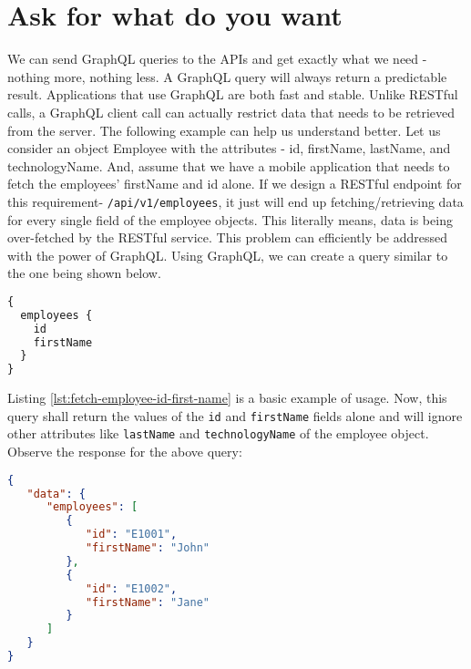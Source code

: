 \documentclass[../main.tex]{subfiles}
\begin{document}
\section{Ask for what do you want}
We can send GraphQL queries to the APIs and get exactly what we need - nothing more, nothing less.
A GraphQL query will always return a predictable result.
Applications that use GraphQL are both fast and stable.
Unlike RESTful calls, a GraphQL client call can actually restrict data that needs to be retrieved from the server.
The following example can help us understand better.
Let us consider an object Employee with the attributes - id, firstName, lastName, and technologyName.
And, assume that we have a mobile application that needs to fetch the employees' firstName and id alone.
If we design a RESTful endpoint for this requirement- \lstinline{/api/v1/employees}, it just will end up fetching/retrieving data for every single field of the employee objects.
This literally means, data is being over-fetched by the RESTful service.
This problem can efficiently be addressed with the power of GraphQL.
Using GraphQL, we can create a query similar to the one being shown below.
\begin{lstlisting}[language=GraphQL, caption={Employee fetch id and name only using GraphQL query}, label={lst:fetch-employee-id-first-name}]
{
  employees {
    id
    firstName
  }
}
\end{lstlisting}
Listing  \ref{lst:fetch-employee-id-first-name} is a basic example of usage.
Now, this query shall return the values of the \lstinline{id} and \lstinline{firstName} fields alone and will ignore other attributes like \lstinline{lastName} and \lstinline{technologyName} of the employee object.
Observe the response for the above query:
\begin{lstlisting}[language=json, caption = {Employee fetch id and name only response}, label={lst:fetch-emp-id-1-name-resp}]
  {
   "data": {
      "employees": [
         {
            "id": "E1001",
            "firstName": "John"
         },
         {
            "id": "E1002",
            "firstName": "Jane"
         }
      ]
   }
}
\end{lstlisting}







\printglossaries
\end{document}

